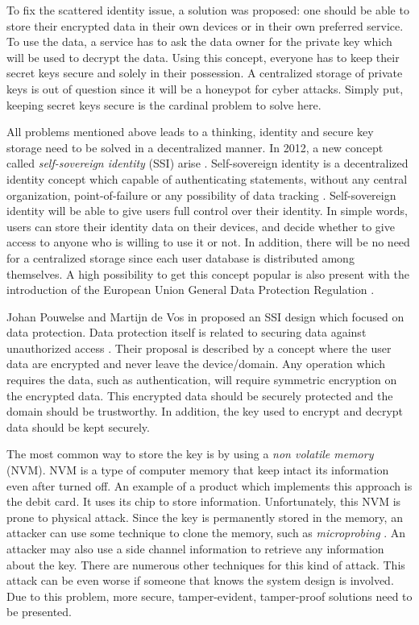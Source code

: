 To fix the scattered identity issue, a solution was proposed: one should be able to store their encrypted data in their own devices or in their own preferred service. To use the data, a service has to ask the data owner for the private key which will be used to decrypt the data. Using this concept, everyone has to keep their secret keys secure and solely in their possession.
A centralized storage of private keys is out of question since it will be a honeypot for cyber attacks. Simply put, keeping secret keys secure is the cardinal problem to solve here.


All problems mentioned above leads to a thinking, identity and secure key storage need to be solved in a decentralized manner.
In 2012, a new concept called \textit{self-sovereign identity} (SSI) arise \cite{moxytongue}.
Self-sovereign identity is a decentralized identity concept which capable of authenticating statements, without any central organization, point-of-failure or any possibility of data tracking \cite{pouwelse}. Self-sovereign identity will be able to give users full control over their identity. In simple words, users can store their identity data on their devices, and decide whether to give access to anyone who is willing to use it or not. In addition, there will be no need for a centralized storage since each user database is distributed among themselves. A high possibility to get this concept popular is also present with the introduction of the European Union General Data Protection Regulation \cite{eur-lex}.

Johan Pouwelse and Martijn de Vos in \cite{pouwelse} proposed an SSI design which focused on data protection.
Data protection itself is related to securing data against unauthorized access \cite{data_protection_scheme}.
Their proposal is described by a concept where the user data are encrypted and never leave the device/domain. Any operation which requires the data, such as authentication, will require symmetric encryption on the encrypted data. This encrypted data should be securely protected and the domain should be trustworthy. In addition, the key used to encrypt and decrypt data should be kept securely.

The most common way to store the key is by using a \textit{non volatile memory} (NVM). NVM is a type of computer memory that keep intact its information even after turned off. An example of a product which implements this approach is the debit card. It uses its chip to store information. Unfortunately, this NVM is prone to physical attack. Since the key is permanently stored in the memory, an attacker can use some technique to clone the memory, such as \textit{microprobing} \cite{skorobogatov_2011}.  An attacker may also use a side channel information to retrieve any information about the key. There are numerous other techniques for this kind of attack. This attack can be even worse if someone that knows the system design is involved. Due to this problem, more secure, tamper-evident, tamper-proof solutions need to be presented.


